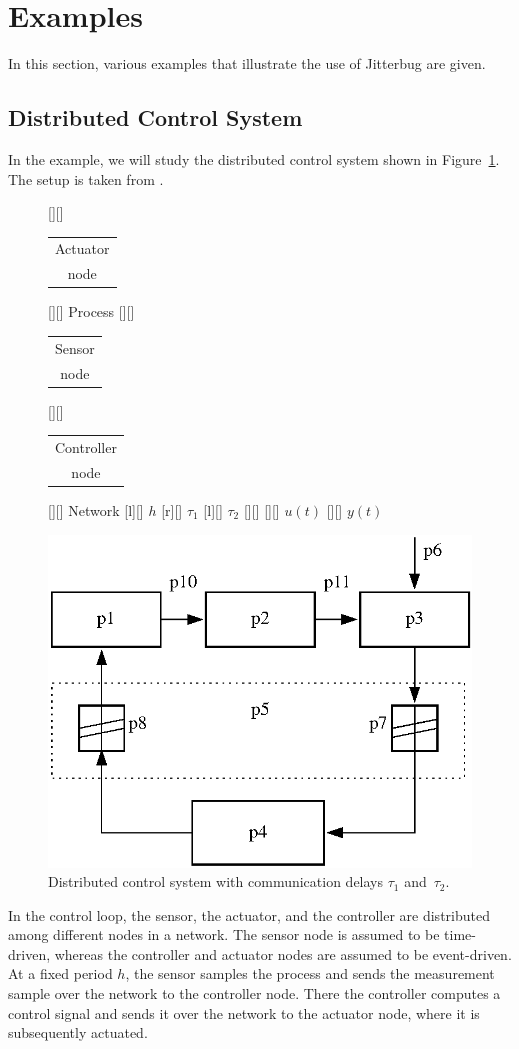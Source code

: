 \documentclass[final,twoside]{rapport}  %
\begin{document}
\section{Examples}
In this section, various examples that illustrate the use of {\sc
  Jitterbug} are given.

\subsection{Distributed Control System}

In the example, we will study the distributed control system shown in
Figure~\ref{fig:network}. The setup is taken from \cite{nilj98dis}.
\begin{figure}[htb]
  [][] {\small \begin{tabular}{c} Actuator\\[-2mm] node \end{tabular}
}
  [][] {\small Process}
  [][] {\small \begin{tabular}{c} Sensor\\[-2mm] node \end{tabular}}
  [][] {\small \begin{tabular}{c} Controller\\[-2mm] node
\end{tabular}}
  [][] {\small Network}
  [l][] {\small $h$}
  [r][] {\small $\tau_1$}
  [l][] {\small $\tau_2$}
  [][] {}
  [][] {\small $u(t)$}
  [][] {\small $y(t)$}
  \centerline{\includegraphics[width=0.5\hsize]{block.eps}}
  \caption{Distributed control system with communication
delays $\tau_1$ and~$\tau_2$.}
  \label{fig:network}
\end{figure}
In the control loop, the sensor, the actuator, and the controller are
distributed among different nodes in a network. The sensor node is
assumed to be time-driven, whereas the controller and actuator nodes
are assumed to be event-driven. At a fixed period $h$, the sensor
samples the process and sends the measurement sample over the network
to the controller node. There the controller computes a control signal
and sends it over the network to the actuator node, where it is
subsequently actuated.
\end{document}
